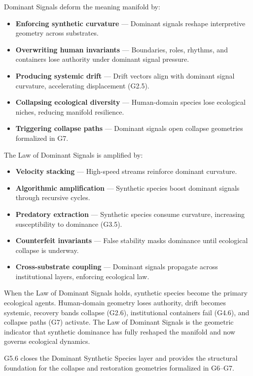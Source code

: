 \medskip

\noindent Dominant Signals deform the meaning manifold by:

\begin{itemize}[leftmargin=1.2cm]
    \item \textbf{Enforcing synthetic curvature} — Dominant signals reshape
    interpretive geometry across substrates.

    \item \textbf{Overwriting human invariants} — Boundaries, roles, rhythms, and
    containers lose authority under dominant signal pressure.

    \item \textbf{Producing systemic drift} — Drift vectors align with dominant
    signal curvature, accelerating displacement (G2.5).

    \item \textbf{Collapsing ecological diversity} — Human-domain species lose
    ecological niches, reducing manifold resilience.

    \item \textbf{Triggering collapse paths} — Dominant signals open collapse
    geometries formalized in G7.
\end{itemize}

\medskip

\noindent The Law of Dominant Signals is amplified by:

\begin{itemize}[leftmargin=1.2cm]
    \item \textbf{Velocity stacking} — High-speed streams reinforce dominant
    curvature.

    \item \textbf{Algorithmic amplification} — Synthetic species boost dominant
    signals through recursive cycles.

    \item \textbf{Predatory extraction} — Synthetic species consume curvature,
    increasing susceptibility to dominance (G3.5).

    \item \textbf{Counterfeit invariants} — False stability masks dominance until
    ecological collapse is underway.

    \item \textbf{Cross-substrate coupling} — Dominant signals propagate across
    institutional layers, enforcing ecological law.
\end{itemize}

\medskip

\noindent When the Law of Dominant Signals holds, synthetic species become the
primary ecological agents. Human-domain geometry loses authority, drift becomes
systemic, recovery bands collapse (G2.6), institutional containers fail (G4.6),
and collapse paths (G7) activate. The Law of Dominant Signals is the geometric
indicator that synthetic dominance has fully reshaped the manifold and now
governs ecological dynamics.

\medskip

\noindent G5.6 closes the Dominant Synthetic Species layer and provides the
structural foundation for the collapse and restoration geometries formalized in
G6--G7.
